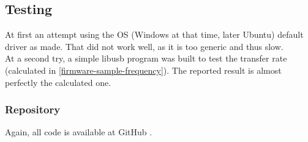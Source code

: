 \subsection{Testing}
At first an attempt using the OS (Windows at that time, later Ubuntu) default driver
as made. That did not work well, as it is too generic and thus slow. \\
At a second try, a simple libusb \cite{libusb} program was built to test the transfer
rate (calculated in \autoref{firmware-sample-frequency}). The reported result is
almost perfectly the calculated one.

\subsubsection{Repository}
Again, all code is available at GitHub \cite{guitar-digitizer-firmware}.
